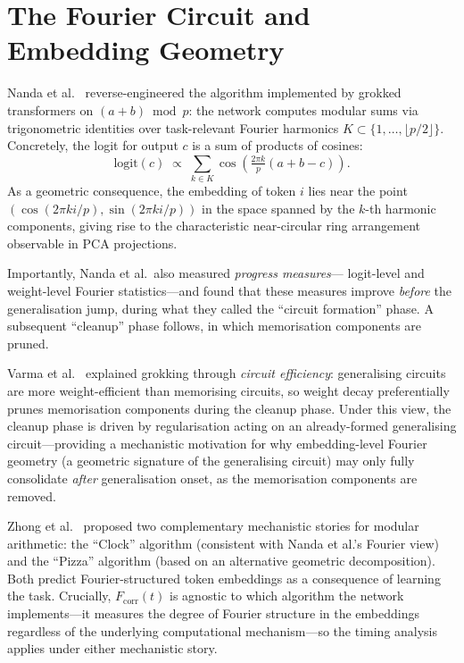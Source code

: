 \documentclass[12pt,openany,a4paper]{book}
\newcommand{\fcorr}{F_{\mathrm{corr}}}
\begin{document}
\section{The Fourier Circuit and Embedding Geometry}

Nanda et al.\ \cite{nanda2023progress} reverse-engineered the
algorithm implemented by grokked transformers on $(a+b)\bmod p$:
the network computes modular sums via trigonometric identities
over task-relevant Fourier harmonics $K\subset\{1,\dots,\lfloor
p/2\rfloor\}$.
Concretely, the logit for output $c$ is a sum of products of cosines:
\[
  \mathrm{logit}(c) \;\propto\; \sum_{k\in K}
    \cos\!\left(\tfrac{2\pi k}{p}(a+b-c)\right).
\]
As a geometric consequence, the embedding of token $i$ lies near
the point $(\cos(2\pi ki/p),\sin(2\pi ki/p))$ in the space spanned
by the $k$-th harmonic components, giving rise to the characteristic
near-circular ring arrangement observable in PCA projections.

Importantly, Nanda et al.\ also measured \emph{progress measures}---
logit-level and weight-level Fourier statistics---and found that these
measures improve \emph{before} the generalisation jump, during what
they called the ``circuit formation'' phase.
A subsequent ``cleanup'' phase follows, in which memorisation
components are pruned.

Varma et al.\ \cite{varma2023explaining} explained grokking through
\emph{circuit efficiency}: generalising circuits are more weight-efficient
than memorising circuits, so weight decay preferentially prunes
memorisation components during the cleanup phase.
Under this view, the cleanup phase is driven by regularisation acting
on an already-formed generalising circuit---providing a mechanistic
motivation for why embedding-level Fourier geometry (a geometric
signature of the generalising circuit) may only fully consolidate
\emph{after} generalisation onset, as the memorisation components
are removed.

Zhong et al.\ \cite{zhong2023clock} proposed two complementary
mechanistic stories for modular arithmetic: the ``Clock'' algorithm
(consistent with Nanda et al.'s Fourier view) and the ``Pizza''
algorithm (based on an alternative geometric decomposition).
Both predict Fourier-structured token embeddings as a consequence of
learning the task.
Crucially, $\fcorr(t)$ is agnostic to which algorithm the network
implements---it measures the degree of Fourier structure in the
embeddings regardless of the underlying computational mechanism---so
the timing analysis applies under either mechanistic story.
\end{document}
